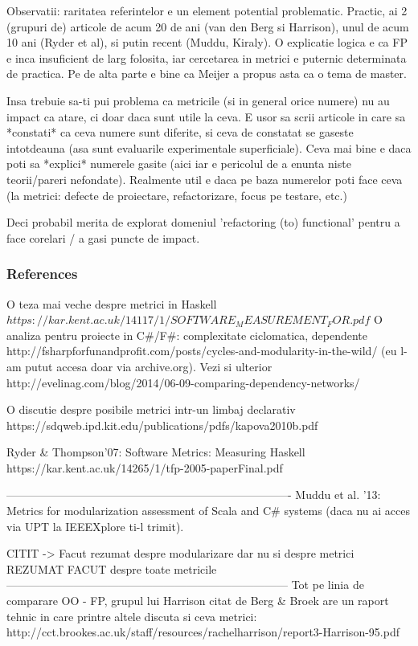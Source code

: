 \documentclass{article}
\begin{document}
Observatii: raritatea referintelor e un element potential problematic.
Practic, ai 2 (grupuri de) articole de acum 20 de ani (van den Berg si
Harrison), unul de acum 10 ani (Ryder et al), si putin recent (Muddu,
Kiraly). O explicatie logica e ca FP e inca insuficient de larg folosita,
iar cercetarea in metrici e puternic determinata de practica.
Pe de alta parte e bine ca Meijer a propus asta ca o tema de master.

Insa trebuie sa-ti pui problema ca metricile (si in general orice numere)
nu au impact ca atare, ci doar daca sunt utile la ceva. E usor sa scrii
articole in care sa *constati* ca ceva numere sunt diferite, si ceva de
constatat se gaseste intotdeauna (asa sunt evaluarile experimentale
superficiale). Ceva mai bine e daca poti sa *explici* numerele gasite
(aici iar e pericolul de a enunta niste teorii/pareri nefondate).
Realmente util e daca pe baza numerelor poti face ceva (la metrici:
defecte de proiectare, refactorizare, focus pe testare, etc.)

Deci probabil merita de explorat domeniul 'refactoring (to) functional'
pentru a face corelari / a gasi puncte de impact.

\subsubsection {References}

O teza mai veche despre metrici in Haskell
        $https://kar.kent.ac.uk/14117/1/SOFTWARE_MEASUREMENT_FOR.pdf$
O analiza pentru proiecte in C\#/F\#: complexitate ciclomatica, dependente
        http://fsharpforfunandprofit.com/posts/cycles-and-modularity-in-the-wild/
(eu l-am putut accesa doar via archive.org). Vezi si ulterior
        http://evelinag.com/blog/2014/06-09-comparing-dependency-networks/

O discutie despre posibile metrici intr-un limbaj declarativ
        https://sdqweb.ipd.kit.edu/publications/pdfs/kapova2010b.pdf

Ryder \& Thompson'07: Software Metrics: Measuring Haskell https://kar.kent.ac.uk/14265/1/tfp-2005-paperFinal.pdf

----------------------------------------------------------------------------
Muddu et al. '13: Metrics for modularization assessment of Scala and C\# systems
(daca nu ai acces via UPT la IEEEXplore ti-l trimit).

CITIT -> Facut rezumat despre modularizare dar nu si despre metrici
REZUMAT FACUT despre toate metricile
---------------------------------------------------------------------------
Tot pe linia de comparare OO - FP, grupul lui Harrison citat de
Berg \& Broek are un raport tehnic in care printre altele discuta
si ceva metrici:
        http://cct.brookes.ac.uk/staff/resources/rachelharrison/report3-Harrison-95.pdf
\end{document}

